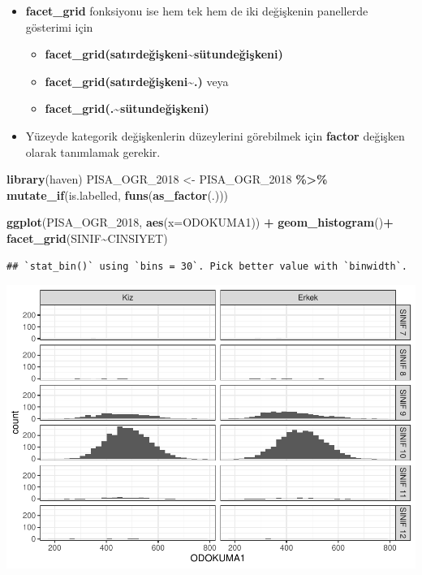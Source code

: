 \documentclass[
  oneside]{book}
\newenvironment{Shaded}{\begin{snugshade}}{\end{snugshade}}
\newcommand{\AttributeTok}[1]{\textcolor[rgb]{0.13,0.29,0.53}{#1}}
\newcommand{\FunctionTok}[1]{\textcolor[rgb]{0.13,0.29,0.53}{\textbf{#1}}}
\newcommand{\NormalTok}[1]{#1}
\newcommand{\OtherTok}[1]{\textcolor[rgb]{0.56,0.35,0.01}{#1}}
\newcommand{\SpecialCharTok}[1]{\textcolor[rgb]{0.81,0.36,0.00}{\textbf{#1}}}
\begin{document}
\begin{itemize}
\item
  \textbf{facet\_grid} fonksiyonu ise hem tek hem de iki değişkenin panellerde gösterimi için

  \begin{itemize}
  \item
    \textbf{facet\_grid(satırdeğişkeni\textasciitilde sütundeğişkeni)}
  \item
    \textbf{facet\_grid(satırdeğişkeni\textasciitilde.)} veya
  \item
    \textbf{facet\_grid(.\textasciitilde sütundeğişkeni)}
  \end{itemize}
\item
  Yüzeyde kategorik değişkenlerin düzeylerini görebilmek için \textbf{factor} değişken olarak tanımlamak gerekir.
\end{itemize}

\begin{Shaded}
\begin{Highlighting}[]
\FunctionTok{library}\NormalTok{(haven)}
\NormalTok{PISA\_OGR\_2018 }\OtherTok{\textless{}{-}} 
\NormalTok{  PISA\_OGR\_2018 }\SpecialCharTok{\%\textgreater{}\%} 
  \FunctionTok{mutate\_if}\NormalTok{(is.labelled, }\FunctionTok{funs}\NormalTok{(}\FunctionTok{as\_factor}\NormalTok{(.)))}
\end{Highlighting}
\end{Shaded}

\begin{Shaded}
\begin{Highlighting}[]
 \FunctionTok{ggplot}\NormalTok{(PISA\_OGR\_2018, }\FunctionTok{aes}\NormalTok{(}\AttributeTok{x=}\NormalTok{ODOKUMA1)) }\SpecialCharTok{+}
  \FunctionTok{geom\_histogram}\NormalTok{()}\SpecialCharTok{+}
  \FunctionTok{facet\_grid}\NormalTok{(SINIF}\SpecialCharTok{\textasciitilde{}}\NormalTok{CINSIYET)}
\end{Highlighting}
\end{Shaded}

\begin{verbatim}
## `stat_bin()` using `bins = 30`. Pick better value with `binwidth`.
\end{verbatim}

\begin{center}\includegraphics[width=0.8\linewidth]{15-betimleyici-istatistik_files/figure-latex/unnamed-chunk-31-1} \end{center}
\end{document}
